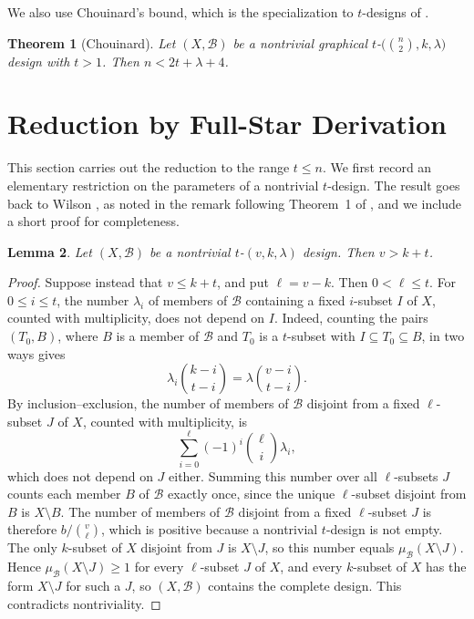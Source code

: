 \documentclass[12pt]{amsart}
\newtheorem{theorem}{Theorem}[section]
\newtheorem{lemma}[theorem]{Lemma}
\theoremstyle{definition}
\newcommand{\cB}{\mathcal{B}}
\begin{document}
We also use Chouinard's bound, which is the specialization to $t$-designs of
\cite[Theorem 2.1]{Chouinard1996}.

\begin{theorem}[Chouinard]
\label{thm:chouinard}
Let $(X, \cB)$ be a nontrivial graphical $t$-$\bigl(\binom{n}{2}, k,
\lambda\bigr)$ design with $t > 1$. Then $n < 2t + \lambda + 4$.
\end{theorem}

\section{Reduction by Full-Star Derivation}
\label{sec:reduction}

This section carries out the reduction to the range $t \leq n$. We first
record an elementary restriction on the parameters of a nontrivial
$t$-design. The result goes back to Wilson \cite{Wilson1973}, as noted in
the remark following Theorem~1 of \cite{GLL1980}, and we include a short
proof for completeness.

\begin{lemma}
\label{lem:vkt}
Let $(X, \cB)$ be a nontrivial $t$-$(v, k, \lambda)$ design. Then $v > k +
t$.
\end{lemma}

\begin{proof}
Suppose instead that $v \leq k + t$, and put $\ell = v - k$. Then $0 < \ell
\leq t$. For $0 \leq i \leq t$, the number $\lambda_i$ of members of $\cB$
containing a fixed $i$-subset $I$ of $X$, counted with multiplicity, does
not depend on $I$. Indeed, counting the pairs $(T_0, B)$, where $B$ is a
member of $\cB$ and $T_0$ is a $t$-subset with $I \subseteq T_0 \subseteq
B$, in two ways gives
\[
\lambda_i \binom{k - i}{t - i} = \lambda \binom{v - i}{t - i}.
\]
By inclusion--exclusion, the number of members of $\cB$ disjoint from a
fixed $\ell$-subset $J$ of $X$, counted with multiplicity, is
\[
\sum_{i=0}^{\ell} (-1)^i \binom{\ell}{i} \lambda_i,
\]
which does not depend on $J$ either. Summing this number over all
$\ell$-subsets $J$ counts each member $B$ of $\cB$ exactly once, since the
unique $\ell$-subset disjoint from $B$ is $X \setminus B$. The number of
members of $\cB$ disjoint from a fixed $\ell$-subset $J$ is therefore $b /
\binom{v}{\ell}$, which is positive because a nontrivial $t$-design is not
empty. The only $k$-subset of $X$ disjoint from $J$ is $X \setminus J$, so
this number equals $\mu_{\cB}(X \setminus J)$. Hence $\mu_{\cB}(X \setminus
J) \geq 1$ for every $\ell$-subset $J$ of $X$, and every $k$-subset of $X$
has the form $X \setminus J$ for such a $J$, so $(X, \cB)$ contains the
complete design. This contradicts nontriviality.
\end{proof}
\end{document}
